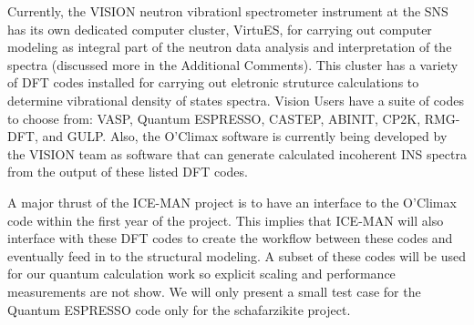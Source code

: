 Currently, the VISION neutron vibrationl spectrometer instrument at the SNS has its own dedicated computer cluster, VirtuES, for carrying out  computer modeling as integral part of the neutron data analysis and interpretation of the spectra (discussed more in the Additional Comments). This cluster has a variety of DFT codes installed for carrying out eletronic struturce calculations to determine vibrational density of states spectra. Vision Users have a suite of codes to choose from: VASP, Quantum ESPRESSO, CASTEP, ABINIT, CP2K, RMG-DFT, and GULP. Also, the O'Climax software is currently being developed by the VISION team as software that can generate calculated incoherent INS spectra from the output of these listed DFT codes. 

A major thrust of the ICE-MAN project is to have an interface to the O'Climax code within the first year of the project. This implies that ICE-MAN will also interface with these DFT codes to create the workflow between these codes and eventually feed in to the structural modeling. A subset of these codes will be used for our quantum calculation work so explicit scaling and performance measurements are not show. We will only present a small test case for the Quantum ESPRESSO code only for the schafarzikite project.